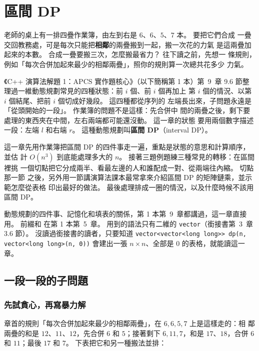 \chapter{區間 DP}
\label{ch:interval-dp}

老師的桌上有一排四疊作業簿，由左到右是 $6$、$6$、$5$、$7$ 本。 要把它們合成
一疊交回教務處，可是每次只能把\textbf{相鄰}的兩疊搬到一起，搬一次花的力氣
是這兩疊加起來的本數。 合成一疊要搬三次，怎麼搬最省力？ 往下讀之前，先想一
條規則，例如「每次合併加起來最少的相鄰兩疊」，照你的規則算一次總共花多少
力氣。

《C++ 演算法解題 1：APCS 實作題核心》（以下簡稱第 1 本）第~9~章 9.6 節整理過一維動態規劃常見的四種狀態：前 $i$ 個、前 $i$ 個再加上
第 $i$ 個的情況、以第 $i$ 個結尾、把前 $i$ 個切成好幾段。 這四種都從序列的
左端長出來，子問題永遠是「從頭開始的一段」。 作業簿的問題不是這樣：先合併中
間的兩疊之後，剩下要處理的東西夾在中間，左右兩端都可能還沒動。 這一章的狀態
要用兩個數字描述一段：左端 $l$ 和右端 $r$。 這種動態規劃叫\textbf{區間
DP}（interval DP）。

這一章先用作業簿把區間 DP 的四件事走一遍，重點是狀態的意思和計算順序，並估
計 $O(n^3)$ 到底能處理多大的 $n$。 接著三題例題練三種常見的轉移：在區間裡挑
一個切點把它分成兩半、看最左邊的人和誰配成一對、從兩端往內縮。 切點那一節
之後，另外用一節講演算法課本最常拿來介紹區間 DP 的矩陣鏈乘，並示範怎麼從表格
印出最好的做法。 最後處理排成一圈的情況，以及什麼時候不該用區間 DP。

動態規劃的四件事、記憶化和填表的關係，第 1 本第~9~章都講過，這一章直接用。 前綴和
在第 1 本第~5~章。 用到的語法只有二維的 \texttt{vector}（銜接書第~3~章 3.6 節）。
沒讀過銜接書的讀者，只要知道 \texttt{vector<vector<long long>> dp(n, vector<long long>(n, 0))}
會建出一張 $n \times n$、全部是 $0$ 的表格，就能讀這一章。

\section{一段一段的子問題}
\label{sec:ivdp-basic}

\subsection{先試貪心，再寫暴力解}

章首的規則「每次合併加起來最少的相鄰兩疊」，在 $6, 6, 5, 7$ 上是這樣走的：相
鄰兩疊的和是 $12$、$11$、$12$，先合併 $6$ 和 $5$；接著剩下 $6, 11, 7$，和是
$17$、$18$，合併 $6$ 和 $11$；最後 $17$ 和 $7$。 下表把它和另一種搬法並排：

